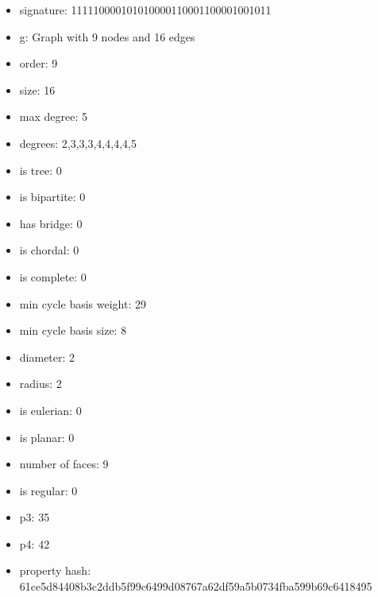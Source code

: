 \newpage
\begin{figure}
\end{figure}
\begin{itemize}
\item signature: 111110000101010000110001100001001011
\item g: Graph with 9 nodes and 16 edges
\item order: 9
\item size: 16
\item max degree: 5
\item degrees: 2,3,3,3,4,4,4,4,5
\item is tree: 0
\item is bipartite: 0
\item has bridge: 0
\item is chordal: 0
\item is complete: 0
\item min cycle basis weight: 29
\item min cycle basis size: 8
\item diameter: 2
\item radius: 2
\item is eulerian: 0
\item is planar: 0
\item number of faces: 9
\item is regular: 0
\item p3: 35
\item p4: 42
\item property hash: 61ce5d84408b3c2ddb5f99c6499d08767a62df59a5b0734fba599b69c6418495
\end{itemize}

